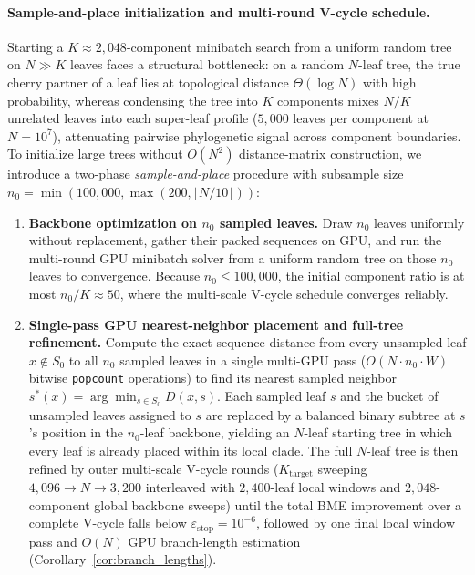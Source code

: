 \documentclass[11pt,a4paper]{article}
\makeatletter
\DeclareRobustCommand{\_}{\ifmmode\nfss@text{\textunderscore}\else\textunderscore\allowbreak\fi}
\theoremstyle{definition}
\makeatother
\begin{document}
\paragraph{Sample-and-place initialization and multi-round V-cycle schedule.}
Starting a $K\approx2{,}048$-component minibatch search from a uniform random tree on $N\gg K$ leaves faces a structural bottleneck: on a random $N$-leaf tree, the true cherry partner of a leaf lies at topological distance $\Theta(\log N)$ with high probability, whereas condensing the tree into $K$ components mixes $N/K$ unrelated leaves into each super-leaf profile ($5{,}000$ leaves per component at $N=10^7$), attenuating pairwise phylogenetic signal across component boundaries.
To initialize large trees without $O(N^2)$ distance-matrix construction, we introduce a two-phase \emph{sample-and-place} procedure with subsample size $n_0=\min(100{,}000,\max(200,\lfloor N/10\rfloor))$:
\begin{enumerate}
 \item \textbf{Backbone optimization on $n_0$ sampled leaves.} Draw $n_0$ leaves uniformly without replacement, gather their packed sequences on GPU, and run the multi-round GPU minibatch solver from a uniform random tree on those $n_0$ leaves to convergence. Because $n_0\leq100{,}000$, the initial component ratio is at most $n_0/K\approx50$, where the multi-scale V-cycle schedule converges reliably.
 \item \textbf{Single-pass GPU nearest-neighbor placement and full-tree refinement.} Compute the exact sequence distance from every unsampled leaf $x\notin S_0$ to all $n_0$ sampled leaves in a single multi-GPU pass ($O(N\cdot n_0\cdot W)$ bitwise \texttt{popcount} operations) to find its nearest sampled neighbor $s^*(x)=\arg\min_{s\in S_0}D(x,s)$. Each sampled leaf $s$ and the bucket of unsampled leaves assigned to $s$ are replaced by a balanced binary subtree at $s$'s position in the $n_0$-leaf backbone, yielding an $N$-leaf starting tree in which every leaf is already placed within its local clade. The full $N$-leaf tree is then refined by outer multi-scale V-cycle rounds ($K_{\mathrm{target}}$ sweeping $4{,}096\to N\to3{,}200$ interleaved with $2{,}400$-leaf local windows and $2{,}048$-component global backbone sweeps) until the total BME improvement over a complete V-cycle falls below $\varepsilon_{\mathrm{stop}}=10^{-6}$, followed by one final local window pass and $O(N)$ GPU branch-length estimation (Corollary~\ref{cor:branch_lengths}).
\end{enumerate}
\end{document}
